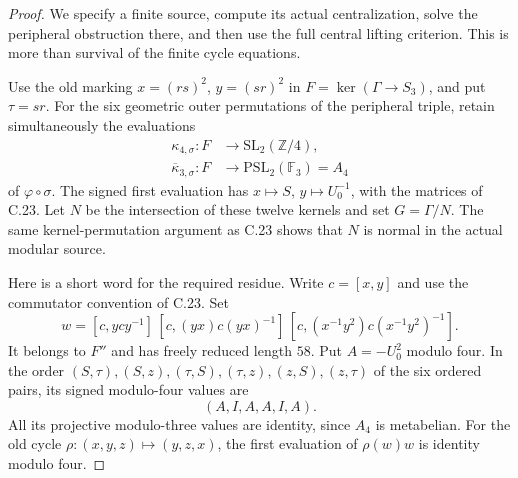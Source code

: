 \begin{proof}
We specify a finite source, compute its actual centralization,
solve the peripheral obstruction there, and then use the full
central lifting criterion. This is more than survival of the
finite cycle equations.

Use the old marking
$x=(rs)^2$, $y=(sr)^2$ in $F=\ker(\Gamma\to S_3)$,
and put $\tau=sr$. For the six geometric outer permutations
of the peripheral triple, retain simultaneously the evaluations
\[
 \begin{split}
 \kappa_{4,\sigma}:F&\longrightarrow
                    \mathrm{SL}_2(\mathbb Z/4),\\
 \overline\kappa_{3,\sigma}:F&\longrightarrow
                    \mathrm{PSL}_2(\mathbb F_3)=A_4
 \end{split}
 \tag{C.27.4}
\]
of $\varphi\circ\sigma$. The signed first evaluation has
$x\mapsto S$, $y\mapsto U_0^{-1}$, with the matrices of C.23.
Let $N$ be the intersection of these twelve kernels and set
$G=\Gamma/N$. The same kernel-permutation argument as C.23
shows that $N$ is normal in the actual modular source.

Here is a short word for the required residue. Write
$c=[x,y]$ and use the commutator convention of C.23. Set
\[
 w=[c,ycy^{-1}]\,
       [c,(yx)c(yx)^{-1}]\,
       [c,(x^{-1}y^2)c(x^{-1}y^2)^{-1}].
 \tag{C.27.5}
\]
It belongs to $F''$ and has freely reduced length $58$.
Put $A=-U_0^2$ modulo four. In the order
$(S,\tau),(S,z),(\tau,S),(\tau,z),(z,S),(z,\tau)$
of the six ordered pairs, its signed modulo-four values are
\[
                           (A,I,A,A,I,A).
 \tag{C.27.6}
\]
All its projective modulo-three values are identity, since
$A_4$ is metabelian. For the old cycle
$\rho:(x,y,z)\mapsto(y,z,x)$, the first evaluation of
$\rho(w)w$ is identity modulo four.


\end{proof}
